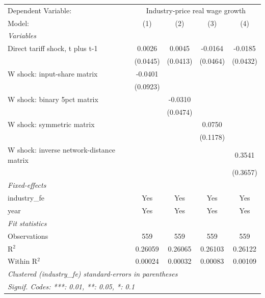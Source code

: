 \begingroup
\centering
\begin{tabular}{lcccc}
   \tabularnewline \midrule \midrule
   Dependent Variable: & \multicolumn{4}{c}{Industry-price real wage growth}\\
   Model:                                   & (1)      & (2)      & (3)      & (4)\\  
   \midrule
   \emph{Variables}\\
   Direct tariff shock, t plus t-1          & 0.0026   & 0.0045   & -0.0164  & -0.0185\\   
                                            & (0.0445) & (0.0413) & (0.0464) & (0.0432)\\   
   W shock: input-share matrix              & -0.0401  &          &          &   \\   
                                            & (0.0923) &          &          &   \\   
   W shock: binary 5pct matrix              &          & -0.0310  &          &   \\   
                                            &          & (0.0474) &          &   \\   
   W shock: symmetric matrix                &          &          & 0.0750   &   \\   
                                            &          &          & (0.1178) &   \\   
   W shock: inverse network-distance matrix &          &          &          & 0.3541\\   
                                            &          &          &          & (0.3657)\\   
   \midrule
   \emph{Fixed-effects}\\
   industry\_fe                             & Yes      & Yes      & Yes      & Yes\\  
   year                                     & Yes      & Yes      & Yes      & Yes\\  
   \midrule
   \emph{Fit statistics}\\
   Observations                             & 559      & 559      & 559      & 559\\  
   R$^2$                                    & 0.26059  & 0.26065  & 0.26103  & 0.26122\\  
   Within R$^2$                             & 0.00024  & 0.00032  & 0.00083  & 0.00109\\  
   \midrule \midrule
   \multicolumn{5}{l}{\emph{Clustered (industry\_fe) standard-errors in parentheses}}\\
   \multicolumn{5}{l}{\emph{Signif. Codes: ***: 0.01, **: 0.05, *: 0.1}}\\
\end{tabular}
\par\endgroup
